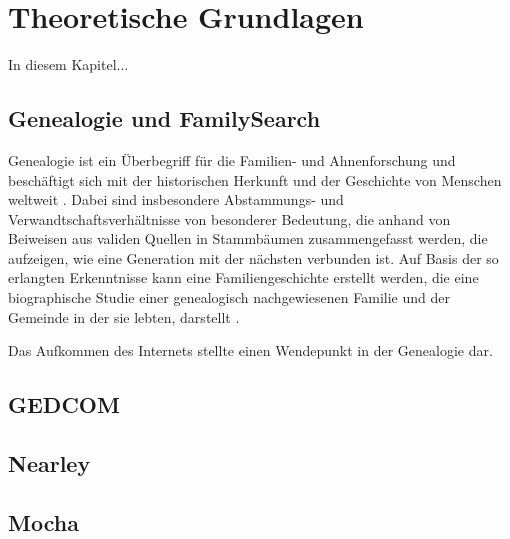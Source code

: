 \chapter{Theoretische Grundlagen}
\label{chap: Theoretische Grundlagen}
In diesem Kapitel...

\section{Genealogie und FamilySearch}
\label{Genealogie und FamilySearch}
Genealogie ist ein Überbegriff für die Familien- und Ahnenforschung und beschäftigt sich mit der historischen Herkunft und der Geschichte von Menschen weltweit \cite{AhnenforschungDE}. Dabei sind insbesondere Abstammungs- und Verwandtschaftsverhältnisse von besonderer Bedeutung, die anhand von Beiweisen aus validen Quellen in Stammbäumen zusammengefasst werden, die aufzeigen, wie eine Generation mit der nächsten verbunden ist. Auf Basis der so erlangten Erkenntnisse kann eine Familiengeschichte erstellt werden, die eine biographische Studie einer genealogisch nachgewiesenen Familie und der Gemeinde in der sie lebten, darstellt \cite{SocietyOfGenealogists}.

Das Aufkommen des Internets stellte einen Wendepunkt in der Genealogie dar. 

\section{GEDCOM}
\label{GEDCOM}


\section{Nearley}
\label{Nearley}


\section{Mocha}
\label{Mocha}